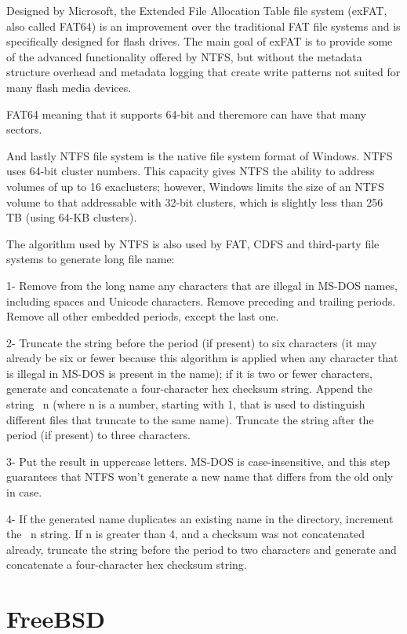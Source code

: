 \documentclass[letterpaper,10pt,draftclsnofoot,onecolumn]{IEEEtran}
\begin{document}
Designed by Microsoft, the Extended File Allocation Table file system (exFAT, also called FAT64) is an improvement over the traditional FAT file systems and is specifically designed for flash drives. The main goal of exFAT is to provide some of the advanced functionality offered by NTFS, but without the metadata structure overhead and metadata logging that create write patterns not suited for many flash media devices.\cite{[1]}

FAT64 meaning that it supports 64-bit and theremore can have that many sectors.

And lastly NTFS  file system is the native file system format of Windows. NTFS uses 64-bit cluster numbers. This capacity gives NTFS the ability to address volumes of up to 16 exaclusters; however, Windows limits the size of an NTFS volume to that addressable with 32-bit clusters, which is slightly less than 256 TB (using 64-KB clusters). 

The algorithm used by NTFS is also used by FAT, CDFS and third-party file systems to generate long file name:

1- Remove from the long name any characters that are illegal in MS-DOS names, including
spaces and Unicode characters. Remove preceding and trailing periods. Remove all other
embedded periods, except the last one.

2- Truncate the string before the period (if present) to six characters (it may already be six or fewer because this algorithm is applied when any character that is illegal in MS-DOS is present in the name); if it is two or fewer characters, generate and concatenate a four-character hex checksum string. Append the string ~n (where n is a number, starting with 1, that is used to distinguish different files that truncate to the same name). Truncate the string after the period (if present) to three characters.

3- Put the result in uppercase letters. MS-DOS is case-insensitive, and this step guarantees that NTFS won’t generate a new name that differs from the old only in case.

4- If the generated name duplicates an existing name in the directory, increment the ~n string. If n is greater than 4, and a checksum was not concatenated already, truncate the string before the period to two characters and generate and concatenate a four-character hex checksum string.
%
%

\section*{FreeBSD}
\end{document}
